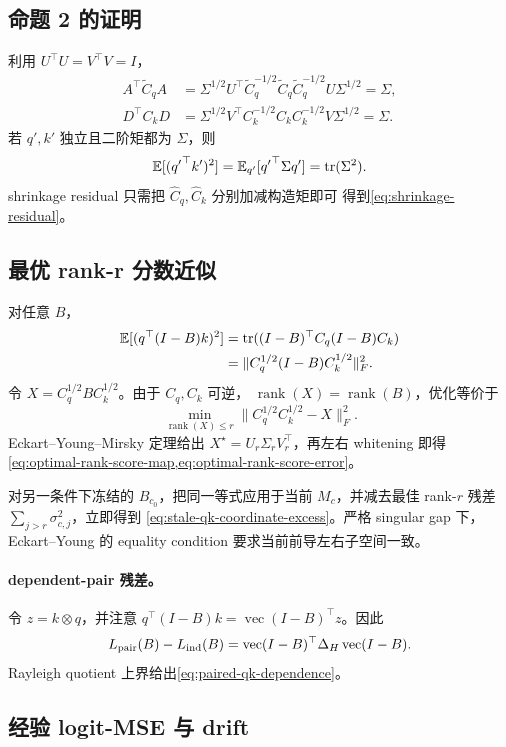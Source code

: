 \subsection{命题 2 的证明}

利用 $U^\top U=V^\top V=I$，
\begin{align}
 A^\top\widetilde C_qA
 &=\Sigma^{1/2}U^\top
 \widetilde C_q^{-1/2}\widetilde C_q
 \widetilde C_q^{-1/2}U\Sigma^{1/2}
 =\Sigma,\\
 D^\top C_kD
 &=\Sigma^{1/2}V^\top
 C_k^{-1/2}C_kC_k^{-1/2}V\Sigma^{1/2}
 =\Sigma.
\end{align}
若 $q',k'$ 独立且二阶矩都为 $\Sigma$，则
\[
 \mathbb E[({q'}^\top k')^2]
 =\mathbb E_{q'}[{q'}^\top\Sigma q']
 =\operatorname{tr}(\Sigma^2).
\]
shrinkage residual 只需把 $\widehat C_q,\widehat C_k$ 分别加减构造矩即可
得到\cref{eq:shrinkage-residual}。

\subsection{最优 rank-r 分数近似}

对任意 $B$，
\begin{align}
 \mathbb E[(q^\top(I-B)k)^2]
 &=\operatorname{tr}((I-B)^\top C_q(I-B)C_k)\\
 &=\|C_q^{1/2}(I-B)C_k^{1/2}\|_F^2 .
\end{align}
令 $X=C_q^{1/2}BC_k^{1/2}$。由于 $C_q,C_k$ 可逆，
$\operatorname{rank}(X)=\operatorname{rank}(B)$，优化等价于
\[
 \min_{\operatorname{rank}(X)\le r}
 \|C_q^{1/2}C_k^{1/2}-X\|_F^2 .
\]
Eckart--Young--Mirsky 定理给出
$X^\star=U_r\Sigma_rV_r^\top$，再左右 whitening 即得
\cref{eq:optimal-rank-score-map,eq:optimal-rank-score-error}。

对另一条件下冻结的 $B_{c_0}$，把同一等式应用于当前 $M_c$，并减去最佳
rank-$r$ 残差 $\sum_{j>r}\sigma_{c,j}^2$，立即得到
\cref{eq:stale-qk-coordinate-excess}。严格 singular gap 下，
Eckart--Young 的 equality condition 要求当前前导左右子空间一致。

\paragraph{dependent-pair 残差。}
令 $z=k\otimes q$，并注意
$q^\top(I-B)k=\operatorname{vec}(I-B)^\top z$。因此
\[
 L_{\rm pair}(B)-L_{\rm ind}(B)
 =\operatorname{vec}(I-B)^\top
 \Delta_H\operatorname{vec}(I-B).
\]
Rayleigh quotient 上界给出\cref{eq:paired-qk-dependence}。

\subsection{经验 logit-MSE 与 drift}

